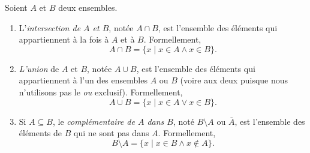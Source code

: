 \documentclass[french,course,oneside,theoremnosection]{lecture}
\begin{document}
\begin{definition}\label{def:ensop}
Soient $A$ et $B$ deux ensembles.
\begin{enumerate}[(1)]
  \item L'\emph{intersection de $A$ et $B$}, notée $A \cap B$, est l'ensemble des éléments qui appartiennent à la fois à $A$ et à $B$. Formellement, \[A \cap B = \{x \mid x \in A \wedge x \in B\}.\]
  
  \item \emph{L'union} de $A$ et $B$, notée $A \cup B$, est l'ensemble des éléments qui appartiennent à l'un des ensembles $A$ ou $B$ (voire aux deux puisque nous n'utilisons pas le \emph{ou} exclusif). Formellement, \[A \cup B = \{x \mid x \in A \vee x \in B\}.\]
  
  \item Si $A \subseteq B$, le \emph{complémentaire de $A$ dans $B$}, noté $B\setminus A$ ou $\overline{A}$, est l'ensemble des éléments de $B$ qui ne sont pas dans $A$. Formellement,  \[B\setminus A  = \{x \mid x \in B \wedge x \notin A\}.\]
\end{enumerate}
\end{definition}
\end{document}
